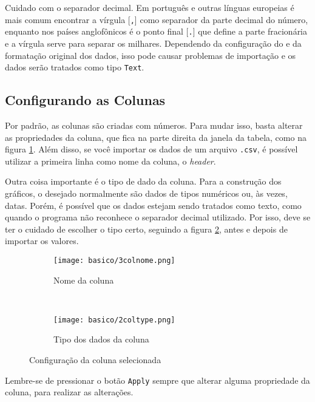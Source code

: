     \begin{lembrete}
        Cuidado com o separador decimal. Em português e outras línguas europeias é mais comum encontrar a vírgula [\texttt{,}] como separador da parte decimal do número, enquanto nos países anglofônicos é o ponto final [\texttt{.}] que define a parte fracionária e a vírgula serve para separar os milhares. Dependendo da configuração do \software e da formatação original dos dados, isso pode causar problemas de importação e os dados serão tratados como tipo \texttt{Text}.
    \end{lembrete}


\subsection{Configurando as Colunas} \label{sec:basico:renome}

    Por padrão, as colunas são criadas com números. Para mudar isso, basta alterar as propriedades da coluna, que fica na parte direita da janela da tabela, como na figura \ref{fig:basico:colnome}. Além disso, se você importar os dados de um arquivo \texttt{.csv}, é possível utilizar a primeira linha como nome da coluna, o \textit{header}.

    Outra coisa importante é o tipo de dado da coluna. Para a construção dos gráficos, o desejado normalmente são dados de tipos numéricos ou, às vezes, datas. Porém, é possível que os dados estejam sendo tratados como texto, como quando o programa não reconhece o separador decimal utilizado. Por isso, deve se ter o cuidado de escolher o tipo certo, seguindo a figura \ref{fig:basico:coltipo}, antes e depois de importar os valores.

    \begin{figure}[htbp]
        \begin{subfigure}{0.45\textwidth}
            \centering
            \texttt{[image: basico/3colnome.png]}

            \caption{Nome da coluna}
            \label{fig:basico:colnome}
        \end{subfigure}
        ~
        \centering
        \begin{subfigure}{0.45\textwidth}
            \centering
            \texttt{[image: basico/2coltype.png]}

            \caption{Tipo dos dados da coluna}
            \label{fig:basico:coltipo}
        \end{subfigure}
        \caption{Configuração da coluna selecionada}
        \label{fig:basico:config}
    \end{figure}

    \begin{lembrete}
        Lembre-se de pressionar o botão \texttt{Apply} sempre que alterar alguma propriedade da coluna, para realizar as alterações.
    \end{lembrete}
